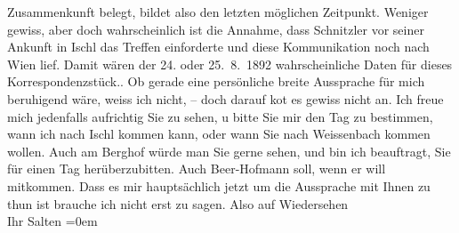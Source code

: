 \begin{ledgroupsized}[t]{13cm}
{{{                  Zusammenkunft belegt, bildet also den letzten möglichen Zeitpunkt. Weniger gewiss,
                  aber doch wahrscheinlich ist die Annahme, dass Schnitzler vor seiner Ankunft in Ischl das Treffen einforderte und diese Kommunikation noch nach Wien lief. Damit wären der 24. oder
                     25. 8. 1892 wahrscheinliche Daten für dieses
                  Korrespondenzstück.}}}\label{K_L03114-1h}. Ob gerade eine persönliche breite Aussprache für mich
               beruhigend wäre, weiss ich nicht, – doch darauf ko{\geminationm}t es
               gewiss nicht an. Ich freue mich jedenfalls aufrichtig Sie zu sehen, u bitte Sie mir
               den Tag zu bestimmen, wann ich nach Ischl kommen
               kann, oder wann Sie nach Weissenbach kommen
               wollen. Auch {\pb}am Berghof würde man Sie gerne sehen, und bin ich beauftragt, Sie
               für einen Tag herüberzubitten. Auch Beer-Hofmann soll, wenn er will mitkommen. Dass es mir hauptsächlich jetzt
               um die Aussprache mit Ihnen zu thun ist brauche ich nicht erst zu sagen.\pend
           \pstart
           Also auf Wiedersehen {\\[\baselineskip]}Ihr \spacefill\mbox{Salten}\pend
           \leftskip=0em{}
         
         \endnumbering{}\end{ledgroupsized}\begin{anhang}\end{anhang}\newcommand{\dateiname}{L03114}\newcommand{\titel}{Felix Salten an Arthur Schnitzler, [24. oder 25.? 8. 1892]}\newcommand{\editorInnen}{Martin Anton Müller und Laura Untner}
      